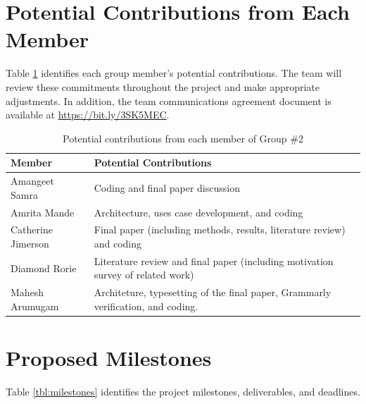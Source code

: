 \documentclass[10pt]{article}
\begin{document}
\section{Potential Contributions from Each Member}

Table \ref{tbl:contributions} identifies each group member's potential contributions. The team will review these commitments throughout the project and make appropriate adjustments. In addition, the team communications agreement document is available at \url{https://bit.ly/3SK5MEC}.

\begin{table}[H]
\small
\begin{center}
\begin{tabular}{|l||l|}
\hline
Member & Potential Contributions\\
\hline
\hline
Amangeet Samra                      & Coding and final paper discussion\\\hline
Amrita Mande                        & Architecture, uses case development, and coding\\\hline
Catherine Jimerson                  & Final paper (including methods, results, literature review) and coding\\\hline
Diamond Rorie                       & Literature review and final paper (including motivation survey of related work)\\\hline
Mahesh Arumugam                     & Architeture, typesetting of the final paper, Grammarly verification, and coding. \\\hline
\end{tabular}
\caption{Potential contributions from each member of Group \#2}
\label{tbl:contributions}    
\end{center}
\end{table}

\section{Proposed Milestones}

Table \ref{tbl:milestones} identifies the project milestones, deliverables, and deadlines. 
\end{document}
